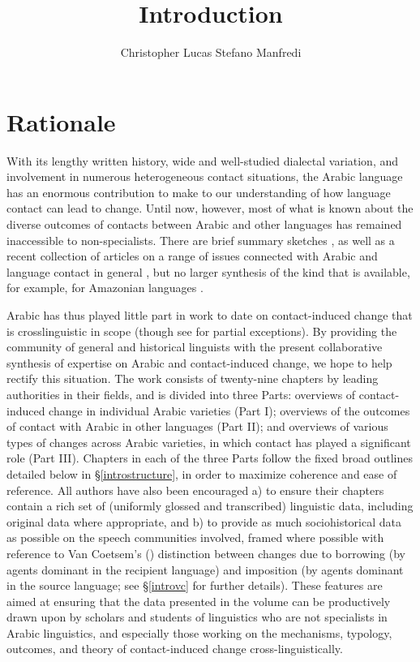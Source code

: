 \documentclass[output=paper]{langsci/langscibook}
\author{Christopher Lucas\affiliation{SOAS University of London}\lastand 
 Stefano Manfredi\affiliation{CNRS, SeDyL}
}
\title{Introduction}
\begin{document}
\label{introintro}

\section{Rationale}
With its lengthy written history, wide and well-studied dialectal variation, and involvement in numerous heterogeneous contact situations, the Arabic language has an enormous contribution to make to our understanding of how language contact can lead to change. Until now, however, most of what is known about the diverse outcomes of contacts between Arabic and other languages has remained inaccessible to non-specialists. There are brief summary sketches \citep{Thomason2011,Versteegh2001article,Versteegh2010,Manfredi2018}, as well as a recent collection of articles on a range of issues connected with Arabic and language contact in general \citep{ManfrediTosco2018}, but no larger synthesis of the kind that is available, for example, for Amazonian languages \citep{Aikhenvald2002}.

Arabic has thus played little part in work to date on contact-induced change that is crosslinguistic in
scope (though see \citealt{Matras2009,Trudgill2011} for partial exceptions). By providing the community of general and historical linguists with the present collaborative synthesis of expertise on Arabic and contact-induced change, we hope to help rectify this situation. The work consists of twenty-nine chapters by leading authorities in their fields, and is divided into three Parts: overviews of contact-induced change in individual Arabic varieties (Part I); overviews of the outcomes of contact with Arabic in other languages (Part II); and overviews of various types of changes across Arabic varieties, in which contact has played a significant role (Part III). Chapters in each of the three Parts follow the fixed broad outlines detailed below in §\ref{introstructure}, in order to maximize coherence and ease of reference. All authors have also been encouraged a) to ensure their chapters contain a rich set of (uniformly glossed and transcribed) linguistic data, including original data where appropriate, and b) to provide as much sociohistorical data as possible on the speech communities involved, framed where possible with reference to Van Coetsem’s (\citeyear{VanCoetsem1988,VanCoetsem2000}) distinction between changes due to borrowing (by agents dominant in the recipient language) and imposition (by agents dominant in the source language; see §\ref{introvc} for further details). These features are aimed at ensuring that the data presented in the volume can be productively drawn upon by scholars and students of linguistics who are not specialists in
Arabic linguistics, and especially those working on the mechanisms, typology, outcomes, and theory of contact-induced change cross-linguistically. 
\end{document}
